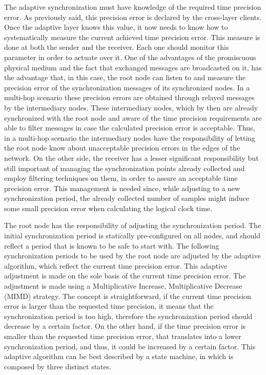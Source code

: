 \documentclass[11pt,a4]{article}
\begin{document}
\begin{multicols}{2}
The adaptive synchronization must have knowledge of the required time precision error. As previously said, this precision error is declared by the cross-layer clients. Once the adaptive layer knows this value, it now needs to know how to systematically measure the current achieved time precision error. This measure is done at both the sender and the receiver. Each one should monitor this parameter in order to actuate over it. One of the advantages of the promiscuous physical medium and the fact that exchanged messages are broadcasted on it, has the advantage that, in this case, the root node can listen to and measure the precision error of the synchronization messages of its synchronized nodes. In a multi-hop scenario these precision errors are obtained through relayed messages by the intermediary nodes. These intermediary nodes, which by then are already synchronized with the root node and aware of the time precision requirements are able to filter messages in case the calculated precision error is acceptable. Thus, in a multi-hop scenario the intermediary nodes have the responsibility of letting the root node know about unacceptable precision errors in the edges of the network. On the other side, the receiver has a lesser significant responsibility but still important of managing the synchronization points already collected and employ filtering techniques on them, in order to assure an acceptable time precision error. This management is needed since, while adjusting to a new synchronization period, the already collected number of samples might induce some small precision error when calculating the logical clock time.

The root node has the responsibility of adjusting the synchronization period. The initial synchronization period is statically pre-configured on all nodes, and should reflect a period that is known to be safe to start with. The following synchronization periods to be used by the root node are adjusted by the adaptive algorithm, which reflect the current time precision error. This adaptive adjustment is made on the sole basis of the current time precision error. The adjustment is made using a Multiplicative Increase, Multiplicative Decrease (MIMD) strategy. The concept is straightforward, if the current time precision error is larger than  the requested time precision, it means that the synchronization period is too high, therefore the synchronization period should decrease by a certain factor. On the other hand, if the time precision error is smaller than the requested time precision error, that translates into a lower synchronization period, and thus, it could be increased by a certain factor. This adaptive algorithm can be best described by a state machine, in which is composed by three distinct states.


\end{multicols}
\end{document}
